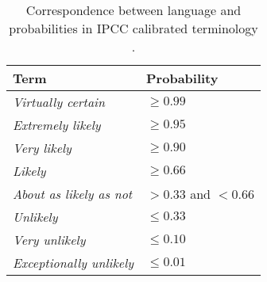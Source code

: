 \documentclass[12pt]{article}
\begin{document}
\begin{table}[t]
\label{t1}
\begin{center}
\begin{tabular}{|l|l|}
\hline
\textbf{Term} & \textbf{Probability}\\
\hline
\textit{Virtually certain} & $\geq0.99$\\
\textit{Extremely likely} & $\geq0.95$\\
\textit{Very likely} & $\geq0.90$\\
\textit{Likely} & $\geq0.66$\\
\textit{About as likely as not} & $>0.33$ and $<0.66$\\
\textit{Unlikely} & $\leq0.33$\\
\textit{Very unlikely} &$\leq0.10$ \\
\textit{Exceptionally unlikely} & $\leq0.01$\\
\hline
\end{tabular}
\end{center}
\caption{Correspondence between language and probabilities in IPCC calibrated terminology \citep{Mas10}.}
\end{table}
%
\end{document}
